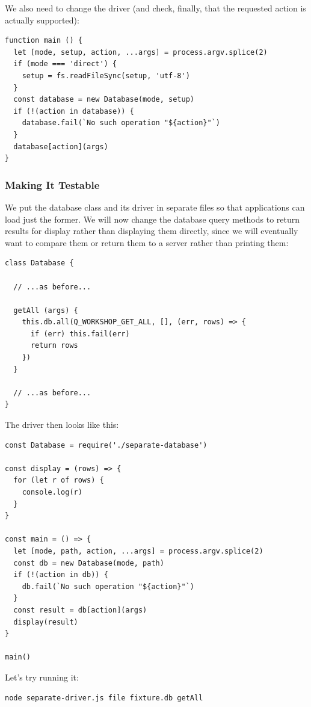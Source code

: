 We also need to change the driver (and check, finally, that the
requested action is actually supported):

\begin{verbatim}
function main () {
  let [mode, setup, action, ...args] = process.argv.splice(2)
  if (mode === 'direct') {
    setup = fs.readFileSync(setup, 'utf-8')
  }
  const database = new Database(mode, setup)
  if (!(action in database)) {
    database.fail(`No such operation "${action}"`)
  }
  database[action](args)
}
\end{verbatim}

\subsubsection{Making It Testable}\label{s:db-testable}

We put the database class and its driver in separate files so that
applications can load just the former. We will now change the database
query methods to return results for display rather than displaying them
directly, since we will eventually want to compare them or return them
to a server rather than printing them:

\begin{verbatim}
class Database {

  // ...as before...

  getAll (args) {
    this.db.all(Q_WORKSHOP_GET_ALL, [], (err, rows) => {
      if (err) this.fail(err)
      return rows
    })
  }

  // ...as before...
}
\end{verbatim}

The driver then looks like this:

\begin{verbatim}
const Database = require('./separate-database')

const display = (rows) => {
  for (let r of rows) {
    console.log(r)
  }
}

const main = () => {
  let [mode, path, action, ...args] = process.argv.splice(2)
  const db = new Database(mode, path)
  if (!(action in db)) {
    db.fail(`No such operation "${action}"`)
  }
  const result = db[action](args)
  display(result)
}

main()
\end{verbatim}

Let's try running it:

\begin{verbatim}
node separate-driver.js file fixture.db getAll
\end{verbatim}

